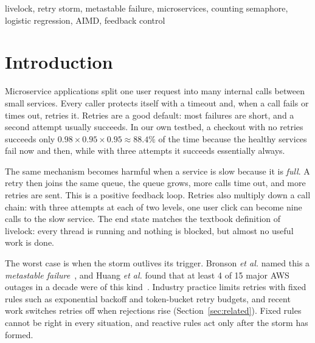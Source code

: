 \documentclass[conference,a4paper]{IEEEtran}
\begin{document}
\begin{IEEEkeywords}
livelock, retry storm, metastable failure, microservices, counting semaphore, logistic regression, AIMD, feedback control
\end{IEEEkeywords}

\section{Introduction}

Microservice applications split one user request into many internal calls between small services. Every caller protects itself with a timeout and, when a call fails or times out, retries it. Retries are a good default: most failures are short, and a second attempt usually succeeds. In our own testbed, a checkout with no retries succeeds only $0.98 \times 0.95 \times 0.95 \approx 88.4\%$ of the time because the healthy services fail now and then, while with three attempts it succeeds essentially always.

The same mechanism becomes harmful when a service is slow because it is \emph{full}. A retry then joins the same queue, the queue grows, more calls time out, and more retries are sent. This is a positive feedback loop. Retries also multiply down a call chain: with three attempts at each of two levels, one user click can become nine calls to the slow service. The end state matches the textbook definition of livelock: every thread is running and nothing is blocked, but almost no useful work is done.

The worst case is when the storm outlives its trigger. Bronson \emph{et al.} named this a \emph{metastable failure}~\cite{bronson2021}, and Huang \emph{et al.} found that at least 4 of 15 major AWS outages in a decade were of this kind~\cite{huang2022}. Industry practice limits retries with fixed rules such as exponential backoff and token-bucket retry budgets, and recent work switches retries off when rejections rise (Section~\ref{sec:related}). Fixed rules cannot be right in every situation, and reactive rules act only after the storm has formed.
\end{document}
